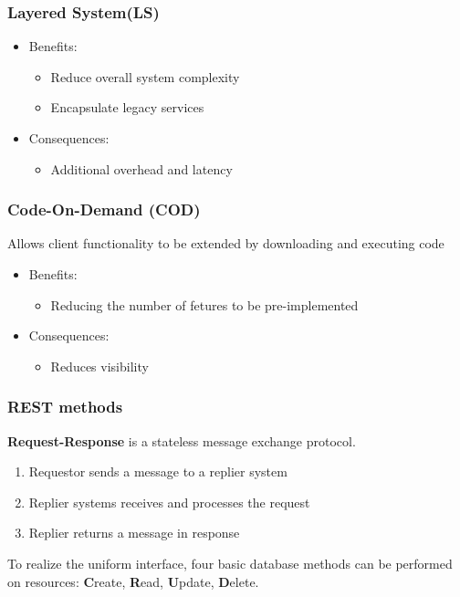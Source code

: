 \subsubsection*{Layered System(LS)}
\begin{itemize}[noitemsep, topsep=0pt]
	\item Benefits:
		\begin{itemize}[noitemsep, topsep=0pt]
			\item Reduce overall system complexity
			\item Encapsulate legacy services
		\end{itemize}
	\item Consequences:
		\begin{itemize}[noitemsep, topsep=0pt]
			\item Additional overhead and latency
		\end{itemize}
\end{itemize}
\subsubsection*{Code-On-Demand (COD)}Allows client functionality to be extended by downloading and executing code
\begin{itemize}[noitemsep, topsep=0pt]
	\item Benefits:
		\begin{itemize}[noitemsep, topsep=0pt]
			\item Reducing the number of fetures to be pre-implemented
		\end{itemize}
	\item Consequences:
		\begin{itemize}[noitemsep, topsep=0pt]
			\item Reduces visibility
		\end{itemize}
\end{itemize}

\subsubsection{REST methods}
\textbf{Request-Response} is a stateless message exchange protocol.
\begin{enumerate}[noitemsep, topsep=0pt]
	\item Requestor sends a message to a replier system
	\item Replier systems receives and processes the request
	\item Replier returns a message in response
\end{enumerate}
To realize the uniform interface, four basic database methods can be performed on resources: \textbf{C}reate, \textbf{R}ead, \textbf{U}pdate, \textbf{D}elete.

